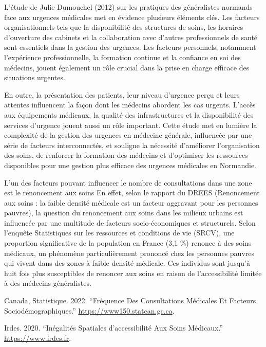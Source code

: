 \documentclass[
]{article}
\newlength{\cslhangindent}
\newenvironment{CSLReferences}[2] %
 {\begin{list}{}{%
  \setlength{\itemindent}{0pt}
  \setlength{\leftmargin}{0pt}
  \setlength{\parsep}{0pt}
  \ifodd #1
   \setlength{\leftmargin}{\cslhangindent}
   \setlength{\itemindent}{-1\cslhangindent}
  \fi
  \setlength{\itemsep}{#2\baselineskip}}}
 {\end{list}}
\begin{document}
L'étude de Julie Dumouchel (2012) sur les pratiques des généralistes
normands face aux urgences médicales met en évidence plusieurs éléments
clés. Les facteurs organisationnels tels que la disponibilité des
structures de soins, les horaires d'ouverture des cabinets et la
collaboration avec d'autres professionnels de santé sont essentiels dans
la gestion des urgences. Les facteurs personnels, notamment l'expérience
professionnelle, la formation continue et la confiance en soi des
médecins, jouent également un rôle crucial dans la prise en charge
efficace des situations urgentes.

En outre, la présentation des patients, leur niveau d'urgence perçu et
leurs attentes influencent la façon dont les médecins abordent les cas
urgents. L'accès aux équipements médicaux, la qualité des
infrastructures et la disponibilité des services d'urgence jouent aussi
un rôle important. Cette étude met en lumière la complexité de la
gestion des urgences en médecine générale, influencée par une série de
facteurs interconnectés, et souligne la nécessité d'améliorer
l'organisation des soins, de renforcer la formation des médecins et
d'optimiser les ressources disponibles pour une gestion plus efficace
des urgences médicales en Normandie.

L'un des facteurs pouvant influencer le nombre de consultations dans une
zone est le renoncement aux soins En effet, selon le rapport du DREES
(Renoncement aux soins : la faible densité médicale est un facteur
aggravant pour les personnes pauvres), la question du renoncement aux
soins dans les milieux urbains est influencée par une multitude de
facteurs socio-économiques et structurels. Selon l'enquête Statistiques
sur les ressources et conditions de vie (SRCV), une proportion
significative de la population en France (3,1 \%) renonce à des soins
médicaux, un phénomène particulièrement prononcé chez les personnes
pauvres qui vivent dans des zones à faible densité médicale. Ces
individus sont jusqu'à huit fois plus susceptibles de renoncer aux soins
en raison de l'accessibilité limitée à des médecins généralistes.

\label{refs}
\begin{CSLReferences}{1}{0}
Canada, Statistique. 2022. {``Fréquence Des Consultations Médicales Et
Facteurs Sociodémographiques.''} \url{https://www150.statcan.gc.ca}.

Irdes. 2020. {``Inégalités Spatiales d'accessibilité Aux Soins
Médicaux.''} \url{https://www.irdes.fr}.

\end{CSLReferences}
\end{document}
